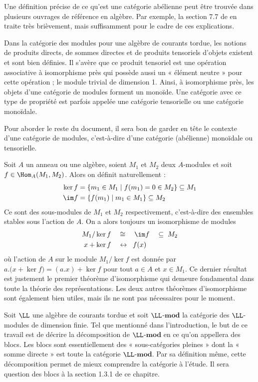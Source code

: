 \begin{Rem} Une définition précise de ce qu'est une catégorie abélienne peut être trouvée dans plusieurs ouvrages de référence en algèbre. Par exemple, la section 7.7 de \cite{Etingof} en traite très brièvement, mais suffisamment pour le cadre de ces explications.
\end{Rem}

Dans la catégorie des modules pour une algèbre de courants tordue, les notions de produits directs, de sommes directes et de produits tensoriels d'objets existent et sont bien définies. Il s'avère que ce produit tensoriel est une opération associative à isomorphisme près qui possède aussi un « élément neutre » pour cette opération ; le module trivial de dimension 1. Ainsi, à isomorphisme près, les objets d'une catégorie de modules forment un monoïde. Une catégorie avec ce type de propriété est parfois appelée une catégorie tensorielle ou une catégorie monoïdale.

\begin{Rem} Pour aborder le reste du document, il sera bon de garder en tête le contexte d'une catégorie de modules, c'est-à-dire d'une catégorie (abélienne) monoïdale ou tensorielle.
\end{Rem}

Soit $A$ un anneau ou une algèbre, soient $M_1$ et $M_2$ deux $A$-modules et soit $f \in \Hom_A(M_1,M_2)$. Alors on définit naturellement :
\begin{align*}
\ker f &= \{m_1 \in M_1 \; | \; f(m_1) = 0 \in M_2\} \subseteq M_1\\
\im f &= \{f(m_1) \; | \; m_1 \in M_1\} \subseteq M_2
\end{align*}
Ce sont des sous-modules de $M_1$ et $M_2$ respectivement, c'est-à-dire des ensembles stables sous l'action de $A$. On a alors toujours un isomorphisme de modules
\begin{align*}
M_1 / \ker f \quad &\cong \quad \im f  \quad \subseteq \; M_2\\
x + \ker f \quad &\leftrightarrow \;\; f(x)
\end{align*}
où l'action de $A$ sur le module $M_1 / \ker f$ est donnée par $a.\big(x + \ker f\big) = (a.x) + \ker f$ pour tout $a \in A$ et $x \in M_1$. Ce dernier résultat est justement le premier théorème d'isomorphisme qui demeure fondamental dans toute la théorie des représentations. Les deux autres théorèmes d'isomorphisme sont également bien utiles, mais ils ne sont pas nécessaires pour le moment.

Soit $\LL$ une algèbre de courants tordue et soit $\LL$-$\mathbf{mod}$ la catégorie des $\LL$-modules de dimension finie. Tel que mentionné dans l'introduction, le but de ce travail est de décrire la décomposition de $\LL$-$\mathbf{mod}$ en ce qu'on appellera des blocs. Les blocs sont essentiellement des « sous-catégories pleines » dont la « somme  directe » est toute la catégorie $\LL$-$\mathbf{mod}$. Par sa définition même, cette décomposition permet de mieux comprendre la catégorie à l'étude. Il sera question des blocs à la section 1.3.1 de ce chapitre.

